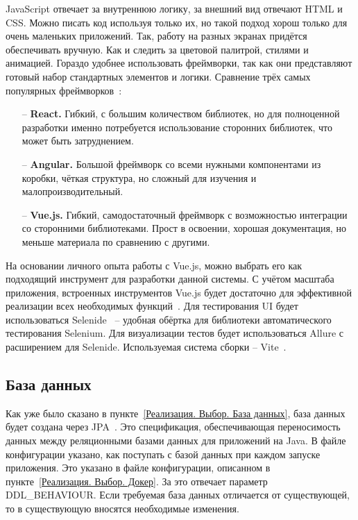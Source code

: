 \documentclass[a4paper,article]{article}
\begin{document}
\begin{sloppypar}
    JavaScript отвечает за внутреннюю логику, за внешний вид отвечают HTML и CSS. Можно писать код используя только их, но такой подход хорош только для очень маленьких приложений. Так, работу на разных экранах придётся обеспечивать вручную. Как и следить за цветовой палитрой, стилями и анимацией. Гораздо удобнее использовать фреймворки, так как они представляют готовый набор стандартных элементов и логики. Сравнение трёх самых популярных фреймворков~\cite{comparejs}:

    \begin{itemize}[nolistsep]
        \item[--] \textbf{React.} Гибкий, с большим количеством библиотек, но для полноценной разработки именно потребуется использование сторонних библиотек, что может быть затруднением.
        \item[--] \textbf{Angular.} Большой фреймворк со всеми нужными компонентами из коробки, чёткая структура, но сложный для изучения и малопроизводительный.
        \item[--] \textbf{Vue.js.} Гибкий, самодостаточный фреймворк с возможностью интеграции со сторонними библиотеками. Прост в освоении, хорошая документация, но меньше материала по сравнению с другими.
    \end{itemize}

    На основании личного опыта работы с Vue.js, можно выбрать его как подходящий инструмент для разработки данной системы. С учётом масштаба приложения, встроенных инструментов Vue.js будет достаточно для эффективной реализации всех необходимых функций~\cite{vuejs}. Для тестирования UI будет использоваться Selenide~\cite{selenide} -- удобная обёртка для библиотеки автоматического тестирования Selenium. Для визуализации тестов будет использоваться Allure с расширением для Selenide. Используемая система сборки -- Vite~\cite{vite}.

    \subsection{База данных}\label{Реализация. База данных}

    Как уже было сказано в пункте~\ref{Реализация. Выбор. База данных}, база данных будет создана через JPA~\cite{springguide}. Это спецификация, обеспечивающая переносимость данных между реляционными базами данных для приложений на Java. В файле конфигурации указано, как поступать с базой данных при каждом запуске приложения. Это указано в файле конфигурации, описанном в пункте~\ref{Реализация. Выбор. Докер}. За это отвечает параметр {DDL\_BEHAVIOUR}. Если требуемая база данных отличается от существующей, то в существующую вносятся необходимые изменения.


\end{sloppypar}
\end{document}
